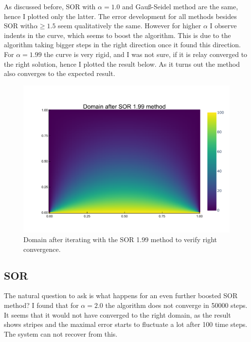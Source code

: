 \documentclass[
	a4paper, %
	10pt, %
]{CSUniSchoolLabReport}
\begin{document}
As discussed before, SOR with $\alpha=1.0$ and Gauß-Seidel method are the same, hence I plotted only the latter. The error development for all methods besides SOR with$\alpha\geq 1.5$ seem qualitatively the same. However for higher $\alpha$ I observe indents in the curve, which seems to boost the algorithm. This is due to the algorithm taking bigger steps in the right direction once it found this direction. 
For $\alpha=1.99$ the curve is very rigid, and I was not sure, if it is relay converged to the right solution, hence I plotted the result below. As it turns out the method also converges to the expected result.

\begin{figure}[H]
	\includegraphics[width=\textwidth]{../saves_t1/sor199_heatmap.pdf}
	\caption{Domain after iterating with the SOR 1.99 method to verify right convergence.}
\end{figure}

\subsection{SOR}

The natural question to ask is what happens for an even further boosted SOR method? I found that for $\alpha = 2.0$ the algorithm does not converge in  50000 steps. It seems that it would not have converged to the right domain, as the result shows stripes and the maximal error starts to fluctuate a lot after 100 time steps. The system can not recover from this.
\end{document}
